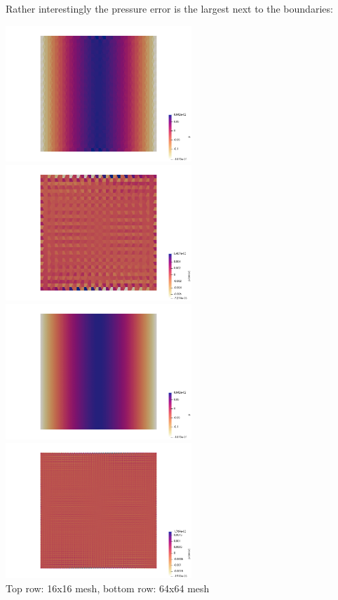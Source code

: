 Rather interestingly the pressure error is the largest next to the boundaries:
\begin{center}
\includegraphics[width=7cm]{python_codes/fieldstone_78/results/mms/p16x16}
\includegraphics[width=7cm]{python_codes/fieldstone_78/results/mms/p16x16_error}\\
\includegraphics[width=7cm]{python_codes/fieldstone_78/results/mms/p64x64}
\includegraphics[width=7cm]{python_codes/fieldstone_78/results/mms/p64x64_error}\\
{\captionfont Top row: 16x16 mesh, bottom row: 64x64 mesh}
\end{center}

